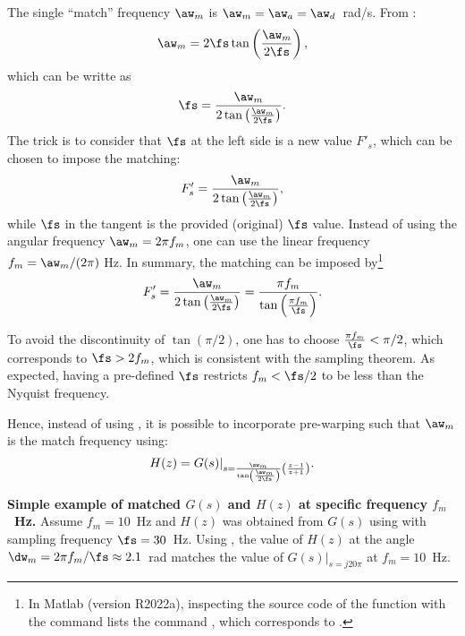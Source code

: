 The single ``match'' frequency $\aw_m$ is $\aw_m = \aw_a = \aw_d$~rad/s. 
 From :
\begin{equation}
\aw_m = 2 \fs \tan \left(  \frac{\aw_m}{2 \fs} \right),
\label{eq:matching_freq_bi}
\end{equation}
which can be writte as
\[
\fs =  \frac{\aw_m}{ 2\tan \left(  \frac{\aw_m}{2 \fs} \right) }.
\]
The trick is to consider that $\fs$ at the left side is a new value $F'_s$, which can be chosen to impose the matching:
\begin{equation}
F'_s =  \frac{\aw_m}{ 2\tan \left(  \frac{\aw_m}{2 \fs} \right) },
\end{equation}
while $\fs$ in the tangent is the provided (original) $\fs$ value.
Instead of using the angular frequency $\aw_m =  2 \pi f_m$, one can use the linear frequency $f_m = \aw_m / (2 \pi)$ Hz.
In summary, the matching can be imposed by\footnote{In Matlab (version R2022a), inspecting the source code of the  function with
the command  lists the command , which corresponds
to .}
\begin{equation}
F'_s =  \frac{\aw_m}{ 2\tan \left(  \frac{\aw_m}{2 \fs} \right) } = \frac{\pi f_m}{ \tan \left(  \frac{\pi f_m}{\fs} \right) }.
\label{eq:bilinearMatchingFreq}
\end{equation}

To avoid the discontinuity of $\tan(\pi/2)$, one has to choose $\frac{\pi f_m}{\fs}<\pi/2$, which
corresponds to $\fs > 2 f_m$, which is consistent with the sampling theorem. As expected, having
a pre-defined $\fs$ restricts $f_m < \fs/2$ to be less than the Nyquist frequency.

Hence, instead of using , it is possible to
 incorporate pre-warping such that $\aw_m$ is the match frequency using:
\begin{equation}
H(z) = G(s)|_{s=\frac{\aw_m}{ \tan \left(  \frac{\aw_m}{2 \fs} \right) } \left( \frac{z-1}{z+1} \right) }.
\label{eq:bilinearWithMatchingViaFs}
\end{equation}

\bExample \textbf{Simple example of matched $G(s)$ and $H(z)$ at specific frequency $f_m$~Hz.}
Assume $f_m = 10$~Hz and $H(z)$ was obtained from 
$G(s)$ using  with sampling frequency $\fs=30$~Hz.
Using , the value
of $H(z)$ at the angle $\dw_m=2\pi f_m/\fs \approx 2.1$~rad matches the value of $G(s)|_{s=j20\pi}$
at $f_m=10$~Hz. 

